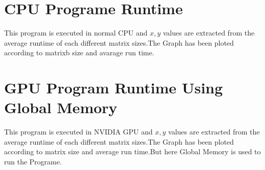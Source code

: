 \documentclass[12pt,oneside,a4paper]{article}
\title{\titlefont{Matrix Multiplication Runtime}}
\author{S.P.S Deemantha (CST140007)}
\begin{document}
	\maketitle


	\newpage

	\tableofcontents

	\newpage

	\section{CPU Programe Runtime}

	\par
	This program is executed in normal CPU and $x,y$ values are extracted from the average runtime of each different matrix sizes.The   Graph has been ploted according to matrixb size and avarage run time.
	\hfill \break


	\newpage


	\section{GPU Program Runtime Using Global Memory}

	\par
	This program is executed in NVIDIA GPU and $x,y$ values are extracted from the average runtime of each different matrix sizes.The   Graph has been ploted according to matrix size and average run time.But here Global Memory is used to run the Programe.
	\hfill \break




	\newpage
\end{document}
